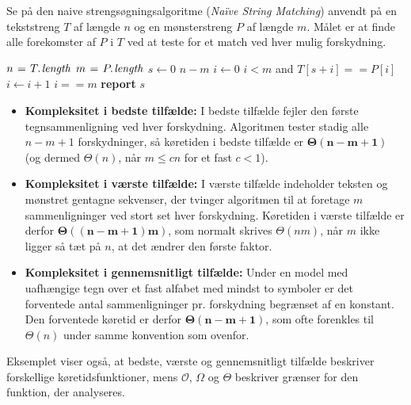 \begin{example}

    Se på den naive strengsøgningsalgoritme (\emph{Naïve String Matching}) anvendt på en tekststreng $T$ af længde $n$ og en mønsterstreng $P$ af længde $m$. Målet er at finde alle forekomster af $P$ i $T$ ved at teste for et match ved hver mulig forskydning.
    
    \begin{codebox}
        \li $n \gets \attrib{T}{length}$
        \li $m \gets \attrib{P}{length}$
        \li \For $s \gets 0$ \To $n - m$ \Do
        \li     $i \gets 0$
        \li     \While $i < m$ and $T[s + i] == P[i]$ \Do
        \li         $i \gets i + 1$
                \End
        \li     \If $i == m$ \Then
        \li         \textbf{report} $s$ 
                \End
            \End
    \end{codebox}
    
    \begin{itemize}
        \item \textbf{Kompleksitet i bedste tilfælde: }  
        I bedste tilfælde fejler den første tegnsammenligning ved hver forskydning. Algoritmen tester stadig alle $n-m+1$ forskydninger, så køretiden i bedste tilfælde er $\boldsymbol{\Theta(n-m+1)}$ (og dermed $\Theta(n)$, når $m\leq cn$ for et fast $c<1$).
    
        \item \textbf{Kompleksitet i værste tilfælde: }
        I værste tilfælde indeholder teksten og mønstret gentagne sekvenser, der tvinger algoritmen til at foretage $m$ sammenligninger ved stort set hver forskydning. Køretiden i værste tilfælde er derfor $\boldsymbol{\Theta((n-m+1)m)}$, som normalt skrives $\Theta(nm)$, når $m$ ikke ligger så tæt på $n$, at det ændrer den første faktor.
    
        \item \textbf{Kompleksitet i gennemsnitligt tilfælde: } 
        Under en model med uafhængige tegn over et fast alfabet med mindst to symboler er det forventede antal sammenligninger pr. forskydning begrænset af en konstant. Den forventede køretid er derfor $\boldsymbol{\Theta(n-m+1)}$, som ofte forenkles til $\Theta(n)$ under samme konvention som ovenfor.
    \end{itemize}
   
    
    Eksemplet viser også, at bedste, værste og gennemsnitligt tilfælde beskriver forskellige køretidsfunktioner, mens $\mathcal{O}$, $\Omega$ og $\Theta$ beskriver grænser for den funktion, der analyseres.
    
    \end{example}

